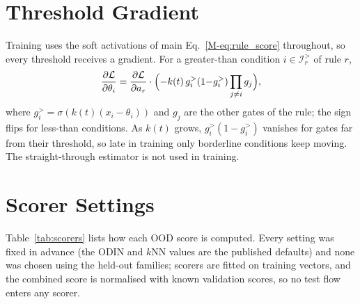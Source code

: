 \documentclass[journal]{IEEEtran}
\begin{document}
\section{Threshold Gradient}
\label{sec:gradient}

Training uses the soft activations of main Eq.~\ref{M-eq:rule_score} throughout, so every
threshold receives a gradient. For a greater-than condition $i\in\mathcal{I}_r^{>}$ of rule $r$,
\begin{equation}
  \frac{\partial \mathcal{L}}{\partial \theta_i} =
    \frac{\partial \mathcal{L}}{\partial a_r} \cdot
    \Bigl(-k(t)\,g_i^{>}(1{-}g_i^{>})\prod_{j \neq i} g_j\Bigr),
\end{equation}
where $g_i^{>}{=}\sigma(k(t)(x_i{-}\theta_i))$ and $g_j$ are the other gates of the rule; the
sign flips for less-than conditions. As $k(t)$ grows, $g_i^{>}(1{-}g_i^{>})$ vanishes for gates
far from their threshold, so late in training only borderline conditions keep moving. The
straight-through estimator is not used in training.

\section{Scorer Settings}
\label{sec:scorers}
Table~\ref{tab:scorers} lists how each OOD score is computed. Every setting was fixed in advance
(the ODIN and $k$NN values are the published defaults) and none was chosen using the held-out
families; scorers are fitted on training vectors, and the combined score is normalised with
known validation scores, so no test flow enters any scorer.
\end{document}
